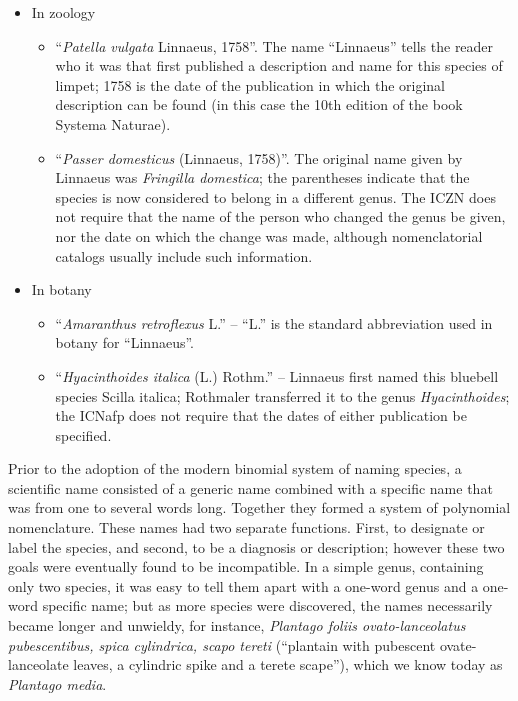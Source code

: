 \begin{itemize}
\tightlist
\item
  In zoology

  \begin{itemize}
  \tightlist
  \item
    ``\emph{Patella vulgata} Linnaeus, 1758''. The name ``Linnaeus'' tells the reader who it was that first published a description and name for this species of limpet; 1758 is the date of the publication in which the original description can be found (in this case the 10th edition of the book Systema Naturae).
  \item
    ``\emph{Passer domesticus} (Linnaeus, 1758)''. The original name given by Linnaeus was \emph{Fringilla domestica}; the parentheses indicate that the species is now considered to belong in a different genus. The ICZN does not require that the name of the person who changed the genus be given, nor the date on which the change was made, although nomenclatorial catalogs usually include such information.
  \end{itemize}
\item
  In botany

  \begin{itemize}
  \tightlist
  \item
    ``\emph{Amaranthus retroflexus} L.'' -- ``L.'' is the standard abbreviation used in botany for ``Linnaeus''.
  \item
    ``\emph{Hyacinthoides italica} (L.) Rothm.'' -- Linnaeus first named this bluebell species Scilla italica; Rothmaler transferred it to the genus \emph{Hyacinthoides}; the ICNafp does not require that the dates of either publication be specified.
  \end{itemize}
\end{itemize}

Prior to the adoption of the modern binomial system of naming species, a scientific name consisted of a generic name combined with a specific name that was from one to several words long. Together they formed a system of polynomial nomenclature. These names had two separate functions. First, to designate or label the species, and second, to be a diagnosis or description; however these two goals were eventually found to be incompatible. In a simple genus, containing only two species, it was easy to tell them apart with a one-word genus and a one-word specific name; but as more species were discovered, the names necessarily became longer and unwieldy, for instance, \emph{Plantago foliis ovato-lanceolatus pubescentibus, spica cylindrica, scapo tereti} (``plantain with pubescent ovate-lanceolate leaves, a cylindric spike and a terete scape''), which we know today as \emph{Plantago media}.

